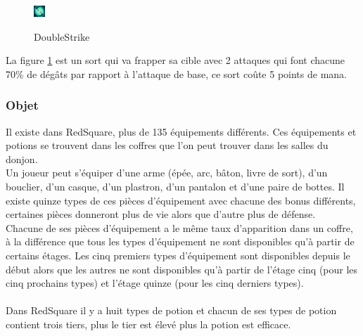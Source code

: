 \documentclass[a4paper, 12pt, twoside]{article}
\begin{document}
\begin{figure}[h]
    \center
    \includegraphics[scale=7]{./Spell/DoubleStrike1} \\
    \caption{DoubleStrike}
    \label{fig:DoubleStrike}
\end{figure}

La figure \ref{fig:DoubleStrike} est un sort qui va frapper sa cible avec 2 attaques qui font chacune 70\% de dégâts par rapport à l'attaque de base, ce sort coûte 5 points de mana.\\

\subsubsection{Objet}
Il existe dans RedSquare, plus de 135 équipements différents. Ces équipements et potions se trouvent dans les coffres que l'on peut trouver dans les salles du donjon. \\
Un joueur peut s'équiper d'une arme (épée, arc, bâton, livre de sort), d'un bouclier, d'un casque, d'un plastron, d'un pantalon et d'une paire de bottes.
Il existe quinze types de ces pièces d'équipement avec chacune des bonus différents, certaines pièces donneront plus de vie alors que d'autre plus de défense.\\
Chacune de ses pièces d'équipement a le même taux d'apparition dans un coffre, à la différence que tous les types d'équipement ne sont disponibles qu'à partir de certains étages.
Les cinq premiers types d'équipement sont disponibles depuis le début alors que les autres ne sont disponibles qu'à partir de l'étage cinq (pour les cinq prochains types) et l'étage quinze (pour les cinq derniers types). 
\\ \\
Dans RedSquare il y a huit types de potion et chacun de ses types de potion contient trois tiers, plus le tier est élevé plus la potion est efficace.\\
\end{document}
